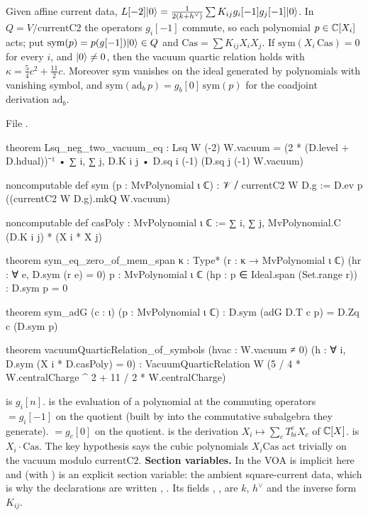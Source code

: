 \begin{theorem}\label{l25:thm:symbols}
Given affine current data, $L[-2]|0\rangle=\frac{1}{2(k+h^\vee)}\sum K_{ij}g_i[-1]g_j[-1]|0\rangle$. In
$Q=V/\mathrm{currentC2}$ the operators $g_i[-1]$ commute, so each polynomial $p\in{\mathbb{C}}[X_i]$ acts; put
$\mathrm{sym}(p)=p(g[-1])|0\rangle\in Q$ and $\mathrm{Cas}=\sum K_{ij}X_iX_j$. If $\mathrm{sym}(X_i\,\mathrm{Cas})=0$
for every $i$, and $|0\rangle\ne0$, then the vacuum quartic relation holds with $\kappa=\frac54c^2+\frac{11}2c$.
Moreover $\mathrm{sym}$ vanishes on the ideal generated by polynomials with vanishing symbol, and
$\mathrm{sym}(\mathrm{ad}_b\,p)=g_b[0]\,\mathrm{sym}(p)$ for the coadjoint derivation $\mathrm{ad}_b$.
\end{theorem}
\noindent File .
\begin{leancode}
theorem Lsq_neg_two_vacuum_eq :
    Lsq W (-2) W.vacuum = (2 * (D.level + D.hdual))⁻¹ •
      ∑ i, ∑ j, D.K i j • D.sq i (-1) (D.sq j (-1) W.vacuum)

noncomputable def sym (p : MvPolynomial ι ℂ) : 𝒱 ⧸ currentC2 W D.g :=
  D.ev p ((currentC2 W D.g).mkQ W.vacuum)

noncomputable def casPoly : MvPolynomial ι ℂ :=
  ∑ i, ∑ j, MvPolynomial.C (D.K i j) * (X i * X j)

theorem sym_eq_zero_of_mem_span {κ : Type*} (r : κ → MvPolynomial ι ℂ)
    (hr : ∀ e, D.sym (r e) = 0) {p : MvPolynomial ι ℂ} (hp : p ∈ Ideal.span (Set.range r)) :
    D.sym p = 0

theorem sym_adG (c : ι) (p : MvPolynomial ι ℂ) : D.sym (adG D.T c p) = D.Zq c (D.sym p)

theorem vacuumQuarticRelation_of_symbols (hvac : W.vacuum ≠ 0)
    (h : ∀ i, D.sym (X i * D.casPoly) = 0) :
    VacuumQuarticRelation W (5 / 4 * W.centralCharge ^ 2 + 11 / 2 * W.centralCharge)
\end{leancode}
\begin{dictionary}
 is $g_i[n]$.  is the evaluation of a polynomial at the commuting operators
 $=g_i[-1]$ on the quotient (built by  into the commutative subalgebra they
generate).  $=g_c[0]$ on the quotient.  is the derivation $X_i\mapsto\sum_cT_{bi}^cX_c$ of
${\mathbb{C}}[X]$.  is $X_i\cdot\mathrm{Cas}$. The key hypothesis says the cubic polynomials
$X_i\mathrm{Cas}$ act trivially on the vacuum modulo $\mathrm{currentC2}$. \textbf{Section variables.} In
 the VOA  is implicit here and
 (with \lean{[Fintype ι]}) is an explicit section variable: the ambient square-current data,
which is why the declarations are written , . Its fields , ,
 are $k$, $h^\vee$ and the inverse form $K_{ij}$.
\end{dictionary}
